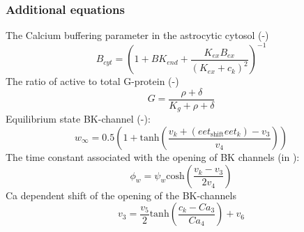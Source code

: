 \subsubsection{Additional equations}
The Calcium buffering parameter in the astrocytic cytosol (-)
\begin{equation} \label{eqRN:B_cyt}
B_{cyt}=\left(1+BK_{end}+ \frac{K_{ex}B_{ex}}{(K_{ex}+c_k)^2}\right)^{-1} 
\end{equation}
The ratio of active to total G-protein (-)
\begin{equation} \label{eqRN:G}
G=\frac{\rho+\delta}{K_g+\rho+\delta}
\end{equation}
Equilibrium state BK-channel (-):
\begin{equation} \label{eqRN:winf}
w_{\infty}=0.5 \left(1+\mathrm{tanh}\left(\frac{v_{k}+(eet_{\mathrm{shift}}eet_k)-v_{3} }{v_{4}} \right)  \right) 
\end{equation}
%
The time constant associated with the opening of BK channels	 (in \pers):
\begin{equation} \label{eqRN:phin}
\phi_{w}=\psi_{w}\mathrm{cosh}\left( \frac{v_{k}-v_{3}}{2v_{4}}\right) 
\end{equation}
\gls{Ca} dependent shift of the opening of the BK-channels
\begin{equation} \label{eqRN:v_3}
v_{3}=\frac{v_5}{2}\mathrm{tanh}\left( \frac{c_k-Ca_3}{Ca_4}\right)+v_6 
\end{equation}

